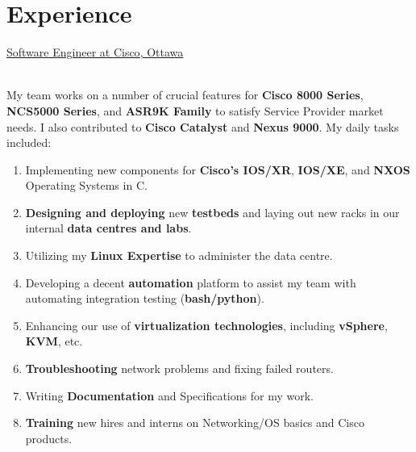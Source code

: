 \documentclass[letterpaper]{twentysecondcv} %
\begin{document}

\section{Experience}

\begin{twenty}

           {\underline{Software Engineer at \textcolor{OliveGreen}{Cisco}, Ottawa}}
           {}
           {\\
            My team works on a number of crucial features for \textbf{Cisco 8000 Series},
            \textbf{NCS5000 Series}, and \textbf{ASR9K Family} to satisfy Service Provider
            market needs. I also contributed to \textbf{Cisco Catalyst} and \textbf{Nexus 9000}.
            My daily tasks included:
            \\
            \begin{enumerate}
               \item{Implementing new components for \textbf{Cisco's IOS/XR}, \textbf{IOS/XE}, and \textbf{NXOS} Operating Systems in C.}
               \item{\textbf{Designing and deploying} new \textbf{testbeds} and laying out new racks in our internal \textbf{data centres and labs}.}
               \item{Utilizing my \textbf{Linux Expertise} to administer the data centre.}
               \item{Developing a decent \textbf{automation} platform to assist my team with automating integration testing (\textbf{bash/python}).}
               \item{Enhancing our use of \textbf{virtualization technologies}, including \textbf{vSphere}, \textbf{KVM}, etc.}
               \item{\textbf{Troubleshooting} network problems and fixing failed routers.}
               \item{Writing \textbf{Documentation} and Specifications for my work.}
               \item{\textbf{Training} new hires and interns on Networking/OS basics and Cisco products.}
            \end{enumerate}
           }


\end{twenty}
\end{document}
